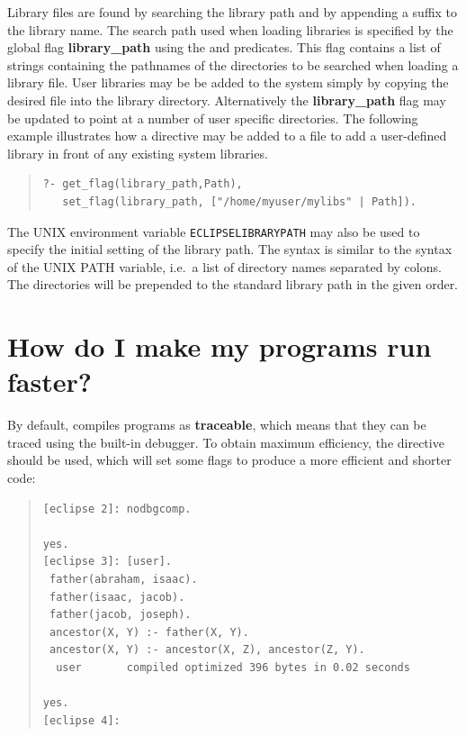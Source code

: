 Library files are found by searching the library path and by appending
a suffix to the library name.
The search path used when loading libraries is
specified by the global flag {\bf library_path} using the
 and
 predicates.
This flag contains a list of strings containing the pathnames of the
directories to be searched when loading a library file.
User libraries may be be added to the system simply by copying the
desired file into the {\eclipse} library directory.
Alternatively the {\bf library_path} flag may be updated to point
at a number of user specific directories. The following example illustrates
how a directive may be added to a file to add a user-defined library in front
of any existing system libraries. 
\begin{quote}
\begin{verbatim}
?- get_flag(library_path,Path),
   set_flag(library_path, ["/home/myuser/mylibs" | Path]).
\end{verbatim}
\end{quote}
The UNIX environment variable {\tt ECLIPSELIBRARYPATH} may also be used to
specify the initial setting of the library path.
The syntax is similar to the syntax of the UNIX PATH variable, i.e.\
a list of directory names separated by colons.
The directories will be prepended to the standard library path in the
given order.

\section{How do I make my programs run faster?}

By default, {\eclipse} compiles programs as {\bf traceable}, which
means that they can be traced using the built-in debugger.
To obtain maximum efficiency, the directive
should be used, which will set some flags to produce a more efficient
and shorter code:
\begin{quote}
\begin{verbatim}
[eclipse 2]: nodbgcomp.

yes.
[eclipse 3]: [user].
 father(abraham, isaac).
 father(isaac, jacob).
 father(jacob, joseph).
 ancestor(X, Y) :- father(X, Y).
 ancestor(X, Y) :- ancestor(X, Z), ancestor(Z, Y).
  user       compiled optimized 396 bytes in 0.02 seconds

yes.
[eclipse 4]: 
\end{verbatim}
\end{quote}

